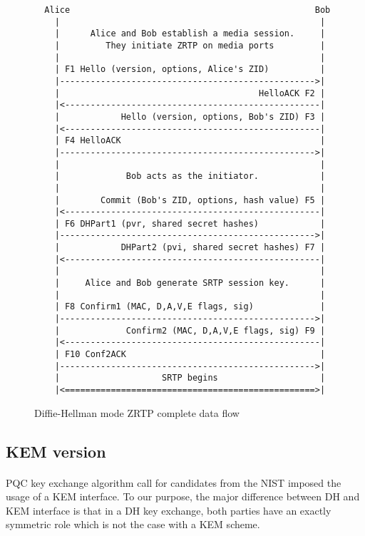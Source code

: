\documentclass[a4paper,11pt]{article}
\begin{document}
\begin{figure}
  \begin{verbatim}
  Alice                                                Bob
    |                                                   |
    |      Alice and Bob establish a media session.     |
    |         They initiate ZRTP on media ports         |
    |                                                   |
    | F1 Hello (version, options, Alice's ZID)          |
    |-------------------------------------------------->|
    |                                       HelloACK F2 |
    |<--------------------------------------------------|
    |            Hello (version, options, Bob's ZID) F3 |
    |<--------------------------------------------------|
    | F4 HelloACK                                       |
    |-------------------------------------------------->|
    |                                                   |
    |             Bob acts as the initiator.            |
    |                                                   |
    |        Commit (Bob's ZID, options, hash value) F5 |
    |<--------------------------------------------------|
    | F6 DHPart1 (pvr, shared secret hashes)            |
    |-------------------------------------------------->|
    |            DHPart2 (pvi, shared secret hashes) F7 |
    |<--------------------------------------------------|
    |                                                   |
    |     Alice and Bob generate SRTP session key.      |
    |                                                   |
    | F8 Confirm1 (MAC, D,A,V,E flags, sig)             |
    |-------------------------------------------------->|
    |             Confirm2 (MAC, D,A,V,E flags, sig) F9 |
    |<--------------------------------------------------|
    | F10 Conf2ACK                                      |
    |-------------------------------------------------->|
    |                    SRTP begins                    |
    |<=================================================>|
  \end{verbatim}
  \caption{Diffie-Hellman mode ZRTP complete data flow}
  \label{fig:DHmode}
\end{figure}
\FloatBarrier


\subsection{KEM version}
\paragraph*{}PQC key exchange algorithm call for candidates from the NIST imposed the usage of a KEM interface. To our purpose, the major difference between DH and KEM interface is that in a DH key exchange, both parties have an exactly symmetric role which is not the case with a KEM scheme.
\end{document}
